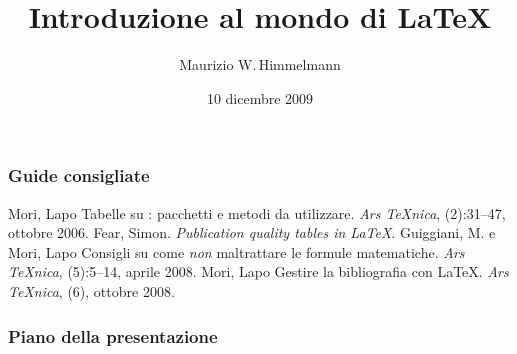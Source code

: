 \documentclass[svgnames,%
	ucs,%
	pdftex]{guitbeamer}
\title{Introduzione al mondo di \LaTeX}
\author[Maurizio W.\,Himmelmann]{Maurizio W.\,Himmelmann}
\date{10 dicembre 2009} %
\begin{document}
\frame{\titlepage}
\begin{frame}
  \frametitle{Guide consigliate}
	\begin{thebibliography}{Fer66}
			Mori, Lapo
			\newblock Tabelle su {\LaTeXe}: pacchetti e metodi da utilizzare.
			\newblock \emph{Ars \TeX nica}, (2):31--47, ottobre 2006.
			Fear, Simon.
			\newblock\textit{Publication quality tables in \LaTeX}.
			Guiggiani, M. e Mori, Lapo
			\newblock Consigli su come \emph{non} maltrattare le formule matematiche.
			\newblock \emph{Ars \TeX nica}, (5):5--14, aprile 2008.
			Mori, Lapo
			\newblock Gestire la bibliografia con {\LaTeX}.
			\newblock \emph{Ars \TeX nica}, (6), ottobre 2008.
	\end{thebibliography}
\end{frame}
\begin{frame}
  \frametitle{Piano della presentazione}
  \tableofcontents
\end{frame}
\end{document}

